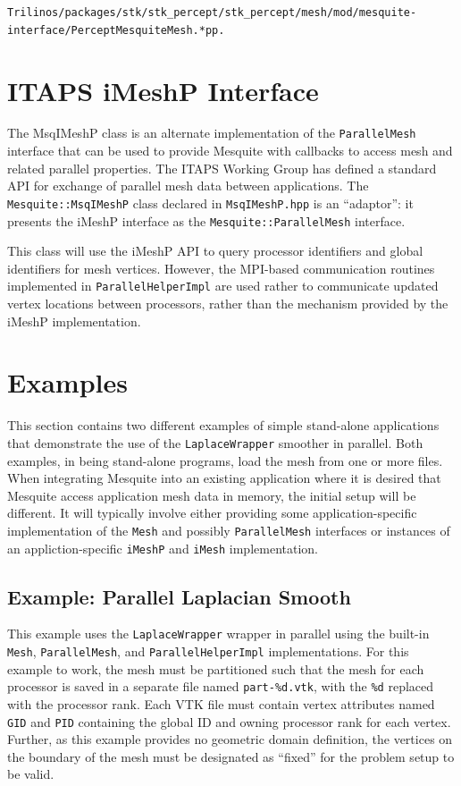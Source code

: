 \texttt{Trilinos/packages/stk/stk\_percept/stk\_percept/mesh/mod/mesquite-interface/PerceptMesquiteMesh.*pp.}

\section{ITAPS iMeshP Interface}

The MsqIMeshP class is an alternate implementation of the \texttt{ParallelMesh} interface that can be used to provide Mesquite with callbacks to access mesh and related parallel properties.  The ITAPS Working Group has defined a standard API for exchange of parallel mesh data between applications. The \texttt{Mesquite::MsqIMeshP} class declared in \texttt{MsqIMeshP.hpp} is an ``adaptor'':  it presents the iMeshP interface as the \texttt{Mesquite::ParallelMesh} interface.

This class will use the iMeshP API to query processor identifiers and global identifiers for mesh vertices.  However, the MPI-based communication routines implemented in \texttt{ParallelHelperImpl} are used rather to communicate updated vertex locations between processors, rather than the mechanism provided by the iMeshP implementation.

\section{Examples}

This section contains two different examples of simple stand-alone applications that demonstrate the use of the \texttt{LaplaceWrapper} smoother in parallel.  Both examples, in being stand-alone programs, load the mesh from one or more files.  When integrating Mesquite into an existing application where it is desired that Mesquite access application mesh data in memory, the initial setup will be different.  It will typically involve either providing some application-specific implementation of the \texttt{Mesh} and possibly \texttt{ParallelMesh} interfaces or instances of an appliction-specific \texttt{iMeshP} and \texttt{iMesh} implementation.

\subsection{Example: Parallel Laplacian Smooth}
\label{sec:parallel-example-1}

This example uses the \texttt{LaplaceWrapper} wrapper in parallel using the built-in \texttt{Mesh}, \texttt{ParallelMesh}, and \texttt{ParallelHelperImpl} implementations.  For this example to work, the mesh must be partitioned such that the mesh for each processor is saved in a separate file named \texttt{part-\%d.vtk}, with the \texttt{\%d} replaced with the processor rank.  Each VTK file must contain vertex attributes named \texttt{GID} and \texttt{PID} containing the global ID and owning processor rank for each vertex.  Further, as this example provides no geometric domain definition, the vertices on the boundary of the mesh must be designated as ``fixed'' for the problem setup to be valid.


